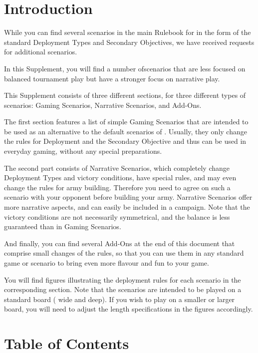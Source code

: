 \section*{Introduction}
\label{introduction}

While you can find several scenarios in the main Rulebook for \nameofthegame{} in the form of the standard Deployment Types and Secondary Objectives, we have received requests for additional scenarios.

In this Supplement, you will find a number ofscenarios that are less focused on balanced tournament play but have a stronger focus on narrative play.

This Supplement consists of three different sections, for three different types of scenarios: Gaming Scenarios, Narrative Scenarios, and Add-Ons.

The first section features a list of simple Gaming Scenarios that are intended to be used as an alternative to the default scenarios of \nameofthegame{}. Usually, they only change the rules for Deployment and the Secondary Objective and thus can be used in everyday gaming, without any special preparations.

The second part consists of Narrative Scenarios, which completely change Deployment Types and victory conditions, have special rules, and may even change the rules for army building. Therefore you need to agree on such a scenario with your opponent before building your army. Narrative Scenarios offer more narrative aspects, and can easily be included in a campaign. Note that the victory conditions are not necessarily symmetrical, and the balance is less guaranteed than in Gaming Scenarios.

And finally, you can find several Add-Ons at the end of this document that comprise small changes of the rules, so that you can use them in any standard game or scenario to bring even more flavour and fun to your game.

You will find figures illustrating the deployment rules for each scenario in the corresponding section. Note that the scenarios are intended to be played on a standard board ( wide and  deep). If you wish to play on a smaller or larger board, you will need to adjust the length specifications in the figures accordingly.

\section*{Table of Contents}


